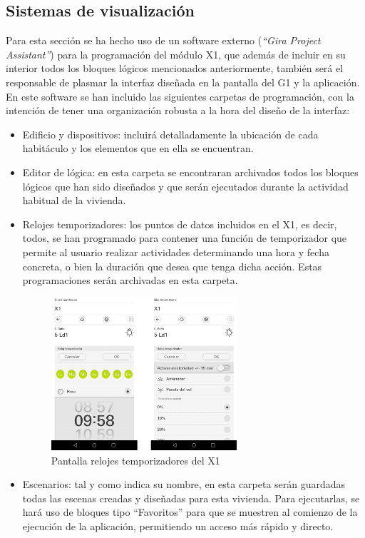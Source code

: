 \subsection{Sistemas de visualización}Para esta sección se ha hecho uso de un software externo (\textit{“Gira Project Assistant”}) para la programación del módulo X1, que además de incluir en su interior todos los bloques lógicos mencionados anteriormente, también será el responsable de plasmar la interfaz diseñada en la pantalla del G1 y la aplicación. En este software se han incluido las siguientes carpetas de programación, con la intención de tener una organización robusta a la hora del diseño de la interfaz: 
\begin{itemize}
\item Edificio y dispositivos: incluirá detalladamente la ubicación de cada habitáculo y los elementos que en ella se encuentran.
\item Editor de lógica: en esta carpeta se encontraran archivados todos los bloques lógicos que han sido diseñados y que serán ejecutados durante la actividad habitual de la vivienda.
\item Relojes temporizadores: los puntos de datos incluidos en el X1, es decir, todos, se han programado para contener una función de temporizador que permite al usuario realizar actividades determinando una hora y fecha concreta, o bien la duración que desea que tenga dicha acción. Estas programaciones serán archivadas en esta carpeta.
\begin{figure}[H]
\centering
\includegraphics[width=0.65\textwidth]{figures/prog_x1_5.png}   
\caption{Pantalla relojes temporizadores del X1}
\label{fig:prog_x1_5}
\end{figure}
\item Escenarios: tal y como indica su nombre, en esta carpeta serán guardadas todas las escenas creadas y diseñadas para esta vivienda. Para ejecutarlas, se hará uso de bloques tipo “Favoritos” para que se muestren al comienzo de la ejecución de la aplicación, permitiendo un acceso más rápido y directo.

\end{itemize}
